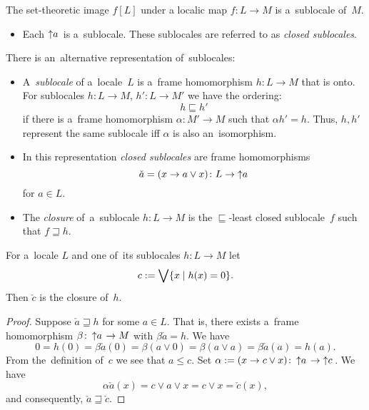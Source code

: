 \begin{fact}
  The set-theoretic image $f[L]$ under a localic map $f\colon L\to M$
  is a~sublocale of~$M$.
\end{fact}

\begin{itemize}
\item Each $\left\uparrow a\right.$ is a~sublocale.
These sublocales are referred to as \emph{closed sublocales\/}.
\end{itemize}

\begin{rem}
  There is an~alternative representation of~sublocales:
  \begin{itemize}
    \item A~\emph{sublocale\/} of a~locale~$L$ is a~frame homomorphism $h\colon
    L \to M$ that is onto.
    For sublocales $h\colon L \to M$, $h'\colon L \to M'$ we have the ordering:
    \[
      h \sqsubseteq h'
    \]
    if there is a~frame homomorphism $\alpha\colon M' \to M$ such that $\alpha
    h' = h$.
    Thus, $h, h'$ represent the same sublocale iff $\alpha$ is also
    an~isomorphism.
    \item In this representation \emph{closed sublocales\/} are frame
    homomorphisms
    \[
      \check{a} = (x \to a \vee x) \colon L \to \left\uparrow a \right.
    \]
    for $a\in L$.
    \item The \emph{closure\/} of~a~sublocale $h\colon L \to M$ is the
    $\sqsubseteq$-least closed sublocale~$f$ such that $f \sqsupseteq h$.
  \end{itemize}

  \begin{prop}
    For a~locale $L$ and one of~its sublocales $h\colon L \to M$ let
    \[
      c := \bigvee \{ x \mid h(x) = 0 \}.
    \]
    Then $\check{c}$ is the closure of~$h$.
  \end{prop}
  \begin{proof}
    Suppose $\check{a} \sqsupseteq h$ for some $a\in L$.
    That is, there exists a~frame homomorphism $\beta\colon \left\uparrow
    a\right. \to M$ with $\beta\check{a} = h$.
    We have
    \[
      0
      = h(0)
      = \beta\check{a}(0)
      = \beta(a \vee 0)
      = \beta(a \vee a)
      = \beta\check{a}(a)
      = h(a).
    \]
    From the~definition of~$c$ we see that $a \le c$.
    Set $\alpha := (x \to c \vee x)\colon \left\uparrow a\right. \to
    \left\uparrow c\right.$.
    We have
    \[
      \alpha\check{a}(x) = c \vee a \vee x = c \vee x = \check{c}(x),
    \]
    and consequently, $\check{a} \sqsupseteq \check{c}$.
  \end{proof}
\end{rem}

